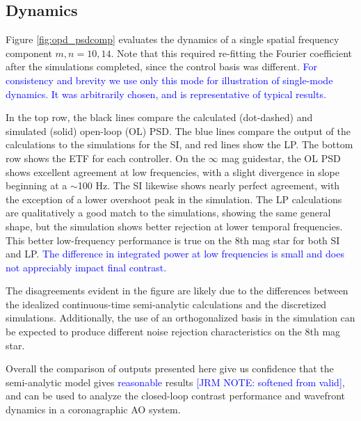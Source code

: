 \documentclass[10pt,preprint]{aastex631}
\newcommand{\jrmadd}[1]{\textcolor{blue}{#1}}
\begin{document}
\subsection{Dynamics}
Figure \ref{fig:opd_psdcomp} evaluates the dynamics of a single spatial frequency component  $m,n = 10,14$.  Note that this required re-fitting the Fourier coefficient after the simulations completed, since the control basis was different.  \jrmadd{For consistency and brevity we use only this mode for illustration of single-mode dynamics.  It was arbitrarily chosen, and is representative of typical results.}

In the top row, the black lines compare the calculated (dot-dashed) and simulated (solid) open-loop (OL) PSD.  The blue lines compare the output of the calculations to the simulations for the SI, and red lines show the LP.  The bottom row shows the ETF for each controller.  On the $\infty$ mag guidestar, the OL PSD shows excellent agreement at low frequencies, with a slight divergence in slope beginning at a $\sim$100 Hz. The SI likewise shows nearly perfect agreement, with the exception of a lower overshoot peak in the simulation.  The LP calculations are qualitatively a good match to the simulations, showing the same general shape, but the simulation shows better rejection at lower temporal frequencies.  This better low-frequency performance is true on the 8th mag star for both SI and LP.  \jrmadd{The difference in integrated power at low frequencies is small and does not appreciably impact final contrast.}  

The disagreements evident in the figure are likely due to the differences between the idealized continuous-time semi-analytic calculations and the discretized simulations.  Additionally, the use of an orthogonalized basis in the simulation can be expected to produce different noise rejection characteristics on the 8th mag star.  

Overall the comparison of outputs presented here give us confidence that the semi-analytic model gives \jrmadd{reasonable} results \jrmadd{[JRM NOTE: softened from valid]}, and can be used to analyze the closed-loop contrast performance and wavefront dynamics in a coronagraphic AO system.
\end{document}
